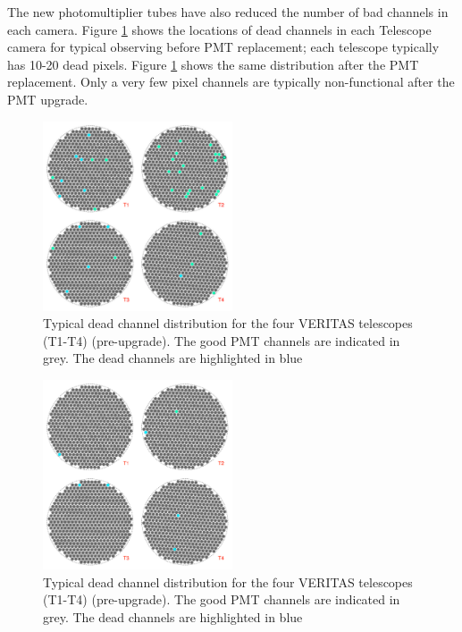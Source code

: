 \documentclass[a4paper]{article}
\begin{document}
The new photomultiplier tubes have also reduced the number of bad channels in each camera. Figure \ref{DeadChan1} shows the locations of dead channels in each Telescope camera for typical   observing before PMT replacement; each telescope typically has 10-20 dead pixels. 
Figure \ref{DeadChan1} shows the same distribution after the PMT replacement. Only a very few pixel channels are typically non-functional after the PMT upgrade.

\begin{figure}[t]
  \centering
  \includegraphics[width=0.5\textwidth]{icrc2013-02}
  \caption{Typical dead channel distribution for the four VERITAS telescopes (T1-T4) (pre-upgrade). The good PMT channels are indicated in grey. The dead channels are highlighted in blue}
  \label{DeadChan1}
 \end{figure}


\begin{figure}[t]
  \centering
  \includegraphics[width=0.5\textwidth]{icrc2013-03}
  \caption{Typical dead channel distribution for the four VERITAS telescopes (T1-T4) (pre-upgrade). The good PMT channels are indicated in grey. The dead channels are highlighted in blue}
  \label{DeadChan2}
 \end{figure}
\end{document}
